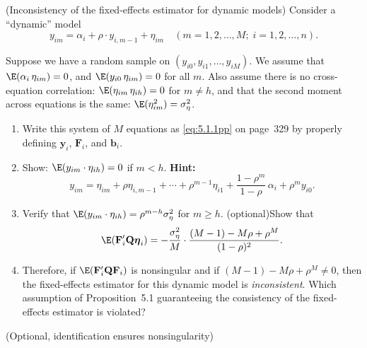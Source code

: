 \begin{problemset}
\exercise[4]
(Inconsistency of the fixed-effects estimator for dynamic models)\quad
Consider a
``dynamic'' model
\[
  y_{im} = \alpha_i + \rho \cdot y_{i,m-1} + \eta_{im}
  \quad (m = 1, 2, \ldots, M;\; i = 1, 2, \ldots, n).
\]

Suppose we have a random sample on $(y_{i0}, y_{i1}, \ldots, y_{iM})$. We assume that
$\E(\alpha_i\,\eta_{im}) = 0$, and $\E(y_{i0}\,\eta_{im}) = 0$ for all $m$. Also assume there is no cross-equation
correlation: $\E(\eta_{im}\,\eta_{ih}) = 0$ for $m \neq h$, and that the second moment
across equations is the same: $\E(\eta_{im}^2) = \sigma_\eta^2$.

\begin{enumerate}[label=(\alph*)]
\item Write this system of $M$ equations as \eqref{eq:5.1.1pp} on page~329 by properly defining
  $\mathbf{y}_i$, $\mathbf{F}_i$, and $\mathbf{b}_i$.

\item Show: $\E(y_{im} \cdot \eta_{ih}) = 0$ if $m < h$. \textbf{Hint:}
  \[
    y_{im} = \eta_{im} + \rho\eta_{i,m-1} + \cdots + \rho^{m-1}\eta_{i1}
    + \frac{1 - \rho^m}{1 - \rho}\,\alpha_i + \rho^m y_{i0}.
  \]

\item Verify that $\E(y_{im} \cdot \eta_{ih}) = \rho^{m-h}\sigma_\eta^2$ for $m \geq h$.
  (optional)\quad Show that
  \[
    \E(\mathbf{F}_i'\mathbf{Q}\boldsymbol{\eta}_i)
    = -\frac{\sigma_\eta^2}{M} \cdot \frac{(M-1) - M\rho + \rho^M}{(1-\rho)^2}.
  \]

\item Therefore, if $\E(\mathbf{F}_i'\mathbf{Q}\mathbf{F}_i)$ is nonsingular and if
  $(M-1) - M\rho + \rho^M \neq 0$, then
  the fixed-effects estimator for this dynamic model is \emph{inconsistent}. Which
  assumption of Proposition~5.1 guaranteeing the consistency of the fixed-effects
  estimator is violated?
\end{enumerate}

\exercise[5]
(Optional, identification ensures nonsingularity)


\end{problemset}
